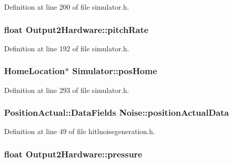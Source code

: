 \-Definition at line 200 of file simulator.\-h.

\hypertarget{group___h_i_t_l_plugin_ga9d3248d73390ba0b13ca165ee1f1fef0}{
\subsubsection[{pitch\-Rate}]{\setlength{\rightskip}{0pt plus 5cm}float {\bf \-Output2\-Hardware\-::pitch\-Rate}}}\label{group___h_i_t_l_plugin_ga9d3248d73390ba0b13ca165ee1f1fef0}


\-Definition at line 192 of file simulator.\-h.

\hypertarget{group___h_i_t_l_plugin_ga9fcd56565e3cb4d64bc0c71c0a6151c1}{
\subsubsection[{pos\-Home}]{\setlength{\rightskip}{0pt plus 5cm}\-Home\-Location$\ast$ {\bf \-Simulator\-::pos\-Home}}}\label{group___h_i_t_l_plugin_ga9fcd56565e3cb4d64bc0c71c0a6151c1}


\-Definition at line 293 of file simulator.\-h.

\hypertarget{group___h_i_t_l_plugin_ga54f9e7005f571fdacf23a67005004b0a}{
\subsubsection[{position\-Actual\-Data}]{\setlength{\rightskip}{0pt plus 5cm}\-Position\-Actual\-::\-Data\-Fields {\bf \-Noise\-::position\-Actual\-Data}}}\label{group___h_i_t_l_plugin_ga54f9e7005f571fdacf23a67005004b0a}


\-Definition at line 49 of file hitlnoisegeneration.\-h.

\hypertarget{group___h_i_t_l_plugin_ga9c1fdbe8d01c5346b54b71beff806a7e}{
\subsubsection[{pressure}]{\setlength{\rightskip}{0pt plus 5cm}float {\bf \-Output2\-Hardware\-::pressure}}}\label{group___h_i_t_l_plugin_ga9c1fdbe8d01c5346b54b71beff806a7e}


